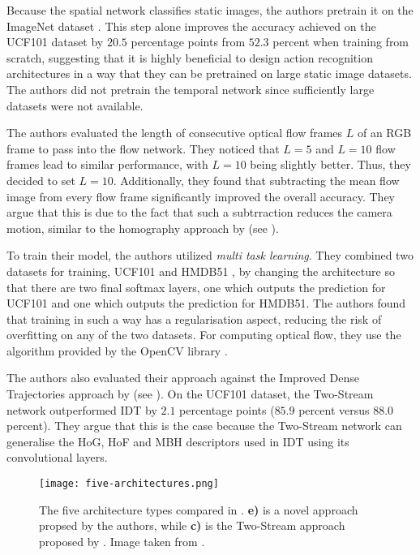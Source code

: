 Because the spatial network classifies static images, the authors pretrain it on the ImageNet dataset \cite{deng_imagenet:_2009}.
This step alone improves the accuracy achieved on the UCF101 dataset by $20.5$ percentage points from $52.3$ percent when training from scratch, suggesting that it is highly beneficial to design action recognition architectures in a way that they can be pretrained on large static image datasets.
The authors did not pretrain the temporal network since sufficiently large datasets were not available.

The authors evaluated the length of consecutive optical flow frames $L$ of an RGB frame to pass into the flow network.
They noticed that $L=5$ and $L=10$ flow frames lead to similar performance, with $L=10$ being slightly better.
Thus, they decided to set $L=10$.
Additionally, they found that subtracting the mean flow image from every flow frame significantly improved the overall accuracy.
They argue that this is due to the fact that such a subtrraction reduces the camera motion, similar to the homography approach by \cite{wang_action_2013} (see ).

To train their model, the authors utilized \textit{multi task learning}.
They combined two datasets for training, UCF101 and HMDB51 \cite{kuehne_hmdb:_2011}, 
by changing the architecture so that there are two final softmax layers, one which outputs the prediction for UCF101 and one which outputs the prediction for HMDB51.
The authors found that training in such a way has a regularisation aspect, reducing the risk of overfitting on any of the two datasets.
For computing optical flow, they use the algorithm provided by the OpenCV library \cite{bradski_opencv_2000}.

The authors also evaluated their approach against the Improved Dense Trajectories approach by \cite{wang_action_2013} (see ).
On the UCF101 dataset, the Two-Stream network outperformed IDT by $2.1$ percentage points ($85.9$ percent versus $88.0$ percent). 
They argue that this is the case because the Two-Stream network can generalise the HoG, HoF and MBH descriptors used in IDT using its convolutional layers.

\begin{figure}[htb!]
    \centering
    \texttt{[image: five-architectures.png]}
    \caption{The five architecture types compared in \cite{carreira_quo_2017}. \textbf{e)} is a novel approach propsed by the authors, while \textbf{c)} is the Two-Stream approach proposed by \cite{simonyan_two-stream_2014}. Image taken from \cite{carreira_quo_2017}. }
    \label{fig:five-architectures}
\end{figure}

